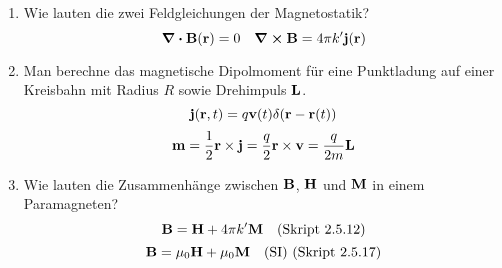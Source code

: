 \documentclass{scrartcl}
\begin{document}
\begin{enumerate}
    \item Wie lauten die zwei Feldgleichungen der Magnetostatik?
          $$\div \vb B(\vb r) = 0\quad \curl \vb B= 4\pi k'\vb j(\vb r)$$

    \item Man berechne das magnetische Dipolmoment für eine Punktladung auf
          einer Kreisbahn mit Radius $R$ sowie Drehimpuls $\vb L$.
          $$\vb j(\vb r,t)=q\vb v(t)\delta(\vb r-\vb r(t))$$
          $$\vb m = \frac{1}{2}\vb r \times \vb j=\frac{q}{2}\vb 
          r\times\vb v=\frac{q}{2m}\vb L$$

    \item Wie lauten die Zusammenhänge zwischen $\vb B$, $\vb H$ 
          und $\vb M$ in einem Paramagneten?
          $$\vb B = \vb H + 4\pi k'\vb M\quad\text{(Skript 2.5.12)}$$
          $$\vb B = \mu_0 \vb H + \mu_0 \vb M \quad\text{(SI) 
          (Skript 2.5.17)}$$

  \end{enumerate}

  \newpage
\end{document}
